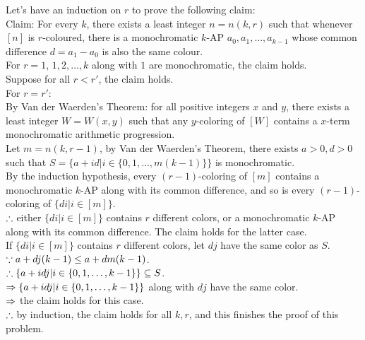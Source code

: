 \setcounter{pr}{0}
\begin{pr}
Let's have an induction on $r$ to prove the following claim:\\
Claim: For every $k$, there exists a least integer $n=n(k, r)$ such that whenever $[n]$ is $r$-coloured, there is a monochromatic $k$-AP $a_0, a_1, \dots, a_{k-1}$ whose common difference $d=a_1-a_0$ is also the same colour.\\
For $r=1$, $1, 2, \dots, k$ along with $1$ are monochromatic, the claim holds.\\
Suppose for all $r<r'$, the claim holds.\\
For $r=r'$:\\
By Van der Waerden's Theorem: for all positive integers $x$ and $y$, there exists a least integer $W=W(x, y)$ such that any $y$-coloring of $[W]$ contains a $x$-term monochromatic arithmetic progression.\\
Let $m=n(k, r-1)$, by Van der Waerden's Theorem, there exists $a>0, d>0$ such that $S=\{a+id|i\in\{0, 1, \dots, m(k-1)\}\}$ is monochromatic.\\
By the induction hypothesis, every $(r-1)$-coloring of $[m]$ contains a monochromatic $k$-AP along with its common difference, and so is every $(r-1)$-coloring of $\{di|i\in[m]\}$.\\
$\therefore$ either $\{di|i\in[m]\}$ contains $r$ different colors, or a monochromatic $k$-AP along with its common difference. The claim holds for the latter case.\\
If $\{di|i\in[m]\}$ contains $r$ different colors, let $dj$ have the same color as $S$.\\
$\because a+dj(k-1)\leq a+dm(k-1)$.\\
$\therefore\{a+idj|i\in\{0, 1, \dots, k-1\}\}\subseteq S$.\\
$\Rightarrow\{a+idj|i\in\{0, 1, \dots, k-1\}\}$ along with $dj$ have the same color.\\
$\Rightarrow$ the claim holds for this case.\\
$\therefore$ by induction, the claim holds for all $k, r$, and this finishes the proof of this problem.
\end{pr}
